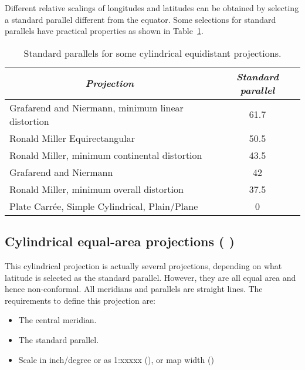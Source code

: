 Different relative scalings of longitudes and latitudes can be obtained by selecting a standard parallel different from the equator. Some selections for standard parallels have practical properties as shown in Table~\ref{tbl:JQ}.
\begin{table}[h]
\centering
\begin{tabular}{lc} \hline
\multicolumn{1}{c}{\emph{Projection}}	&
\multicolumn{1}{c}{\emph{Standard parallel}} \\ \hline
Grafarend and Niermann, minimum linear distortion		& 61.7\DS\\
Ronald Miller Equirectangular						& 50.5\DS\\
Ronald Miller, minimum continental distortion			& 43.5\DS\\
Grafarend and Niermann								& 42\DS\\
Ronald Miller, minimum overall distortion				& 37.5\DS\\
Plate Carr\'{e}e, Simple Cylindrical, Plain/Plane	  	& 0\DS\\\hline
\end{tabular}
\caption{Standard parallels for some cylindrical equidistant projections.}
\label{tbl:JQ}
\end{table}


\subsection{Cylindrical equal-area projections ( )}


This cylindrical projection is actually several projections,
depending on what latitude is selected as the standard parallel.
However, they are all equal area and hence non-conformal.  All
meridians and parallels are straight lines.  The requirements
to define this projection are:

\begin{itemize} 
\item The central meridian.
\item The standard parallel.
\item Scale in inch/degree or as 1:xxxxx (), or map width ()
\end{itemize}

